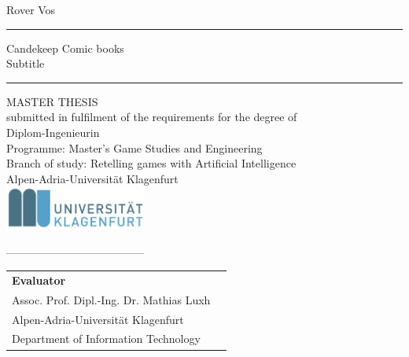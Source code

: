 \begin{titlepage}
\begin{center}

    {\LARGE Rover Vos\\}
    \vspace{5mm}
    \rule{\textwidth}{1pt}
	{ \LARGE Candekeep Comic books  \\
	\vspace*{3mm}Subtitle}
	\vspace*{3mm}
\rule{\textwidth}{1pt}

    \vspace{15mm}
	{\LARGE \sc MASTER THESIS} \\
    \vspace{8mm}
	\normalsize{submitted in fulfilment of the requirements for the degree of}\\
	\vspace{8mm}
	\Large{Diplom-Ingenieurin}\\
	\vspace{8mm}
	\normalsize{Programme: Master’s Game Studies and Engineering}\\	\vspace{2mm}
	\normalsize{Branch of study: Retelling games with Artificial Intelligence}\\
	\vspace{2mm}
     \vspace{8mm}%
	\Large{Alpen-Adria-Universit\"at Klagenfurt}\\
    \vspace{4mm}
    \includegraphics[width=0.35\textwidth]{images/uniklulogo.png}

  \vspace{0.5 mm}%
  -------------------------------------- \\
\end{center}

    \vspace{1mm}
    \enlargethispage{1cm}

\begin{tabular}{ l l }

\textbf{Evaluator}\\
Assoc. Prof. Dipl.-Ing. Dr. Mathias Luxh \\
Alpen-Adria-Universit\"at Klagenfurt \\
Department of Information Technology\\

\end{tabular}


\vspace{10mm}
\\    

\end{titlepage}

\afterpage{\blankpage}
	
	
